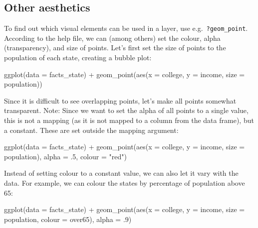 \documentclass[
]{article}
\newenvironment{Shaded}{\begin{snugshade}}{\end{snugshade}}
\newcommand{\AttributeTok}[1]{\textcolor[rgb]{0.77,0.63,0.00}{#1}}
\newcommand{\DecValTok}[1]{\textcolor[rgb]{0.00,0.00,0.81}{#1}}
\newcommand{\FunctionTok}[1]{\textcolor[rgb]{0.00,0.00,0.00}{#1}}
\newcommand{\NormalTok}[1]{#1}
\newcommand{\SpecialCharTok}[1]{\textcolor[rgb]{0.00,0.00,0.00}{#1}}
\newcommand{\StringTok}[1]{\textcolor[rgb]{0.31,0.60,0.02}{#1}}
\begin{document}
\hypertarget{other-aesthetics}{%
\subsection{Other aesthetics}\label{other-aesthetics}}

To find out which visual elements can be used in a layer, use
e.g.~\texttt{?geom\_point}. According to the help file, we can (among
others) set the colour, alpha (transparency), and size of points. Let's
first set the size of points to the population of each state, creating a
bubble plot:

\begin{Shaded}
\begin{Highlighting}[]
\FunctionTok{ggplot}\NormalTok{(}\AttributeTok{data =}\NormalTok{ facts\_state) }\SpecialCharTok{+} 
  \FunctionTok{geom\_point}\NormalTok{(}\FunctionTok{aes}\NormalTok{(}\AttributeTok{x =}\NormalTok{ college, }\AttributeTok{y =}\NormalTok{ income, }\AttributeTok{size =}\NormalTok{ population))}
\end{Highlighting}
\end{Shaded}

Since it is difficult to see overlapping points, let's make all points
somewhat transparent. Note: Since we want to set the alpha of all points
to a single value, this is not a mapping (as it is not mapped to a
column from the data frame), but a constant. These are set outside the
mapping argument:

\begin{Shaded}
\begin{Highlighting}[]
\FunctionTok{ggplot}\NormalTok{(}\AttributeTok{data =}\NormalTok{ facts\_state) }\SpecialCharTok{+} 
  \FunctionTok{geom\_point}\NormalTok{(}\FunctionTok{aes}\NormalTok{(}\AttributeTok{x =}\NormalTok{ college, }\AttributeTok{y =}\NormalTok{ income, }\AttributeTok{size =}\NormalTok{ population), }
             \AttributeTok{alpha =}\NormalTok{ .}\DecValTok{5}\NormalTok{, }
             \AttributeTok{colour =} \StringTok{"red"}\NormalTok{)}
\end{Highlighting}
\end{Shaded}

Instead of setting colour to a constant value, we can also let it vary
with the data. For example, we can colour the states by percentage of
population above 65:

\begin{Shaded}
\begin{Highlighting}[]
\FunctionTok{ggplot}\NormalTok{(}\AttributeTok{data =}\NormalTok{ facts\_state) }\SpecialCharTok{+} 
  \FunctionTok{geom\_point}\NormalTok{(}\FunctionTok{aes}\NormalTok{(}\AttributeTok{x =}\NormalTok{ college, }\AttributeTok{y =}\NormalTok{ income, }\AttributeTok{size =}\NormalTok{ population, }\AttributeTok{colour =}\NormalTok{ over65), }
             \AttributeTok{alpha =}\NormalTok{ .}\DecValTok{9}\NormalTok{)}
\end{Highlighting}
\end{Shaded}
\end{document}
